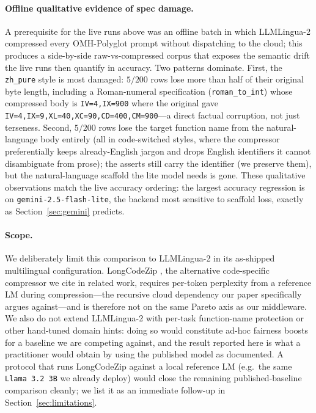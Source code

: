 \documentclass[11pt,a4paper,twocolumn]{article}
\begin{document}
\paragraph{Offline qualitative evidence of spec damage.} A prerequisite for the live runs above was an offline batch in which LLMLingua-2 compressed every OMH-Polyglot prompt without dispatching to the cloud; this produces a side-by-side raw-vs-compressed corpus that exposes the semantic drift the live runs then quantify in accuracy. Two patterns dominate. First, the \texttt{zh\_pure} style is most damaged: $5/200$ rows lose more than half of their original byte length, including a Roman-numeral specification (\texttt{roman\_to\_int}) whose compressed body is \verb|IV=4,IX=900| where the original gave \verb|IV=4,IX=9,XL=40,XC=90,CD=400,CM=900|---a direct factual corruption, not just terseness. Second, $5/200$ rows lose the target function name from the natural-language body entirely (all in code-switched styles, where the compressor preferentially keeps already-English jargon and drops English identifiers it cannot disambiguate from prose); the asserts still carry the identifier (we preserve them), but the natural-language scaffold the lite model needs is gone. These qualitative observations match the live accuracy ordering: the largest accuracy regression is on \texttt{gemini-2.5-flash-lite}, the backend most sensitive to scaffold loss, exactly as Section~\ref{sec:gemini} predicts.

\paragraph{Scope.} We deliberately limit this comparison to LLMLingua-2 in its as-shipped multilingual configuration. LongCodeZip \cite{shi2025longcodezip}, the alternative code-specific compressor we cite in related work, requires per-token perplexity from a reference LM during compression---the recursive cloud dependency our paper specifically argues against---and is therefore not on the same Pareto axis as our middleware. We also do not extend LLMLingua-2 with per-task function-name protection or other hand-tuned domain hints: doing so would constitute ad-hoc fairness boosts for a baseline we are competing against, and the result reported here is what a practitioner would obtain by using the published model as documented. A protocol that runs LongCodeZip against a local reference LM (e.g.\ the same \texttt{Llama 3.2 3B} we already deploy) would close the remaining published-baseline comparison cleanly; we list it as an immediate follow-up in Section~\ref{sec:limitations}.
\end{document}
